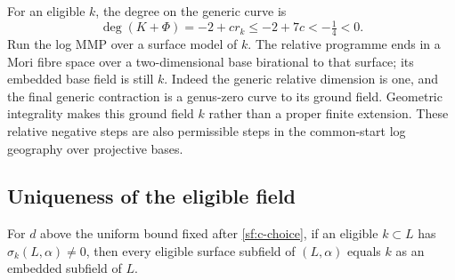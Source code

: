 For an eligible $k$, the degree on the generic curve is
\begin{equation}\label{sf:negative-degree}
             \deg(K+\Phi)=-2+cr_k\leq-2+7c<-\tfrac14<0.
\end{equation}
Run the log MMP over a surface model of $k$.  The relative programme
ends in a Mori fibre space over a two-dimensional base birational to
that surface; its embedded base field is still $k$.  Indeed the
generic relative dimension is one, and the final generic contraction
is a genus-zero curve to its ground field.  Geometric integrality
makes this ground field $k$ rather than a proper finite extension.
These relative negative steps are also permissible steps in the
common-start log geography over projective bases.

\subsection{Uniqueness of the eligible field}

\begin{proposition}
\label{sf:unique}
For $d$ above the uniform bound fixed after \eqref{sf:c-choice}, if
an eligible $k\subset L$ has
$\sigma_k(L,\alpha)\ne0$, then every eligible surface subfield of
$(L,\alpha)$ equals $k$ as an embedded subfield of $L$.
\end{proposition}

